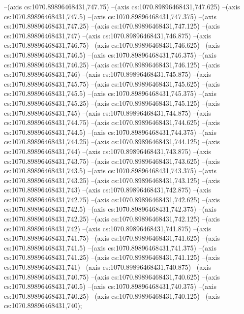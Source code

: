 --(axis cs:1070.89896468431,747.75)
--(axis cs:1070.89896468431,747.625)
--(axis cs:1070.89896468431,747.5)
--(axis cs:1070.89896468431,747.375)
--(axis cs:1070.89896468431,747.25)
--(axis cs:1070.89896468431,747.125)
--(axis cs:1070.89896468431,747)
--(axis cs:1070.89896468431,746.875)
--(axis cs:1070.89896468431,746.75)
--(axis cs:1070.89896468431,746.625)
--(axis cs:1070.89896468431,746.5)
--(axis cs:1070.89896468431,746.375)
--(axis cs:1070.89896468431,746.25)
--(axis cs:1070.89896468431,746.125)
--(axis cs:1070.89896468431,746)
--(axis cs:1070.89896468431,745.875)
--(axis cs:1070.89896468431,745.75)
--(axis cs:1070.89896468431,745.625)
--(axis cs:1070.89896468431,745.5)
--(axis cs:1070.89896468431,745.375)
--(axis cs:1070.89896468431,745.25)
--(axis cs:1070.89896468431,745.125)
--(axis cs:1070.89896468431,745)
--(axis cs:1070.89896468431,744.875)
--(axis cs:1070.89896468431,744.75)
--(axis cs:1070.89896468431,744.625)
--(axis cs:1070.89896468431,744.5)
--(axis cs:1070.89896468431,744.375)
--(axis cs:1070.89896468431,744.25)
--(axis cs:1070.89896468431,744.125)
--(axis cs:1070.89896468431,744)
--(axis cs:1070.89896468431,743.875)
--(axis cs:1070.89896468431,743.75)
--(axis cs:1070.89896468431,743.625)
--(axis cs:1070.89896468431,743.5)
--(axis cs:1070.89896468431,743.375)
--(axis cs:1070.89896468431,743.25)
--(axis cs:1070.89896468431,743.125)
--(axis cs:1070.89896468431,743)
--(axis cs:1070.89896468431,742.875)
--(axis cs:1070.89896468431,742.75)
--(axis cs:1070.89896468431,742.625)
--(axis cs:1070.89896468431,742.5)
--(axis cs:1070.89896468431,742.375)
--(axis cs:1070.89896468431,742.25)
--(axis cs:1070.89896468431,742.125)
--(axis cs:1070.89896468431,742)
--(axis cs:1070.89896468431,741.875)
--(axis cs:1070.89896468431,741.75)
--(axis cs:1070.89896468431,741.625)
--(axis cs:1070.89896468431,741.5)
--(axis cs:1070.89896468431,741.375)
--(axis cs:1070.89896468431,741.25)
--(axis cs:1070.89896468431,741.125)
--(axis cs:1070.89896468431,741)
--(axis cs:1070.89896468431,740.875)
--(axis cs:1070.89896468431,740.75)
--(axis cs:1070.89896468431,740.625)
--(axis cs:1070.89896468431,740.5)
--(axis cs:1070.89896468431,740.375)
--(axis cs:1070.89896468431,740.25)
--(axis cs:1070.89896468431,740.125)
--(axis cs:1070.89896468431,740);

